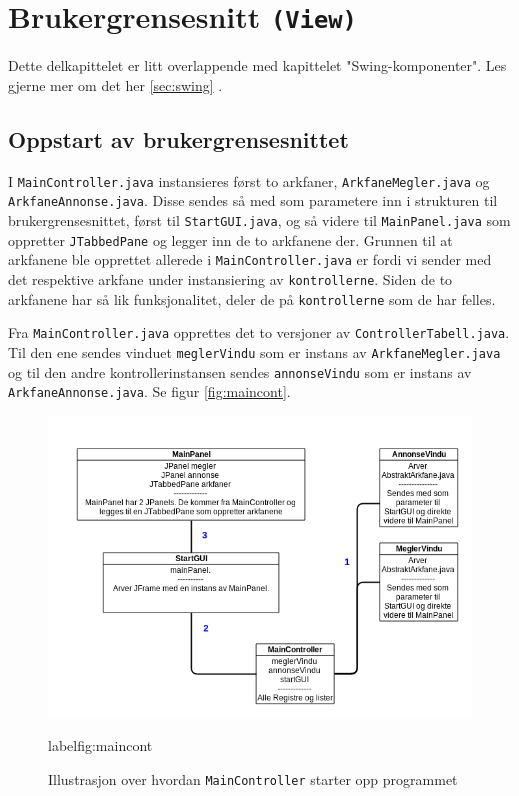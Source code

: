 \section{Brukergrensesnitt \texttt{(View)}} \label{sec:brukergrensesnitt}

Dette delkapittelet er litt overlappende med kapittelet "Swing-komponenter". Les gjerne mer om det her \ref{sec:swing} \pageref{sec:swing}.

\subsection{Oppstart av brukergrensesnittet}
I \texttt{MainController.java} instansieres først to arkfaner, \texttt{ArkfaneMegler.java} og \texttt{ArkfaneAnnonse.java}.
Disse sendes så med som parametere inn i strukturen til brukergrensesnittet, først til \texttt{StartGUI.java}, og så videre til \texttt{MainPanel.java} som oppretter \texttt{JTabbedPane} og legger inn de to arkfanene der.
Grunnen til at arkfanene ble opprettet allerede i \texttt{MainController.java} er fordi vi sender med det respektive arkfane under instansiering av \texttt{kontrollerne}. 
Siden de to arkfanene har så lik funksjonalitet, deler de på \texttt{kontrollerne} som de har felles.

Fra \texttt{MainController.java} opprettes det to versjoner av \texttt{ControllerTabell.java}. Til den ene sendes vinduet \texttt{meglerVindu} som er instans av \texttt{ArkfaneMegler.java} og til den andre kontrollerinstansen sendes \texttt{annonseVindu} som er instans av \texttt{ArkfaneAnnonse.java}.
Se figur \ref{fig:maincont}.

\begin{figure}[ht]
\includegraphics[width=\textwidth,height=\textheight,keepaspectratio]{./img/produktdokumentasjon/bilder/Controller_og_GUI-opprettelse2.png}
\caption[\texttt{MainController}: Programmoppstart]{Illustrasjon over hvordan \texttt{MainController} starter opp programmet}
label{fig:maincont}
\end{figure}


